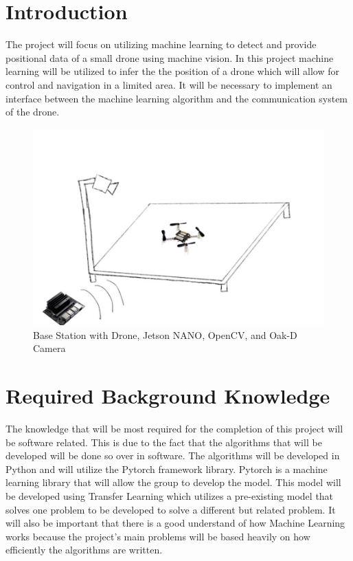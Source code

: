 \documentclass[12pt,onecolumn]{IEEEtran}			%
\begin{document}
 
 \section{Introduction}
The project will focus on utilizing machine learning to detect and provide positional data of a small drone using machine vision. In this project machine learning will be utilized to infer the the position of a drone which will allow for control and navigation in a limited area. It will be necessary to implement an interface between the machine learning algorithm and the communication system of the drone. \\

\begin{figure}[hp]
    \centering
    \includegraphics[width=12cm]{Images/senior design figure.PNG}
    \caption{Base Station with Drone, Jetson NANO, OpenCV, and Oak-D Camera}
    \label{fig:galaxy}
\end{figure}


\section{Required Background Knowledge}
The knowledge that will be most required for the completion of this project will be software related. This is due to the fact that the algorithms that will be developed will be done so over in software. The algorithms will be developed in Python and will utilize the Pytorch framework library. Pytorch is a machine learning library that will allow the group to develop the model. This model will be developed using Transfer Learning which utilizes a pre-existing model that solves one problem to be developed to solve a different but related problem. It will also be important that there is a good understand of how Machine Learning works because the project's main problems will be based heavily on how efficiently the algorithms are written. 
\end{document}
